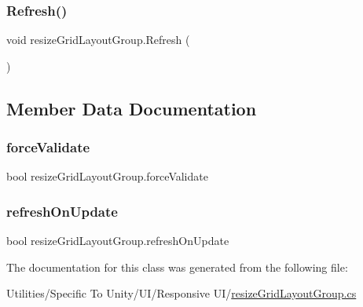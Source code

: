 \subsubsection{\texorpdfstring{Refresh()}{Refresh()}}
{\footnotesize\ttfamily void resize\+Grid\+Layout\+Group.\+Refresh (\begin{DoxyParamCaption}{ }\end{DoxyParamCaption})\hspace{0.3cm}{\ttfamily [inline]}}



\subsection{Member Data Documentation}
\mbox{\label{classresize_grid_layout_group_a138a851001032d6d388cae022f8c3e6f}} 
\subsubsection{\texorpdfstring{force\+Validate}{forceValidate}}
{\footnotesize\ttfamily bool resize\+Grid\+Layout\+Group.\+force\+Validate}

\mbox{\label{classresize_grid_layout_group_a578454d3481dd15bc62a7ec53702d98d}} 
\subsubsection{\texorpdfstring{refresh\+On\+Update}{refreshOnUpdate}}
{\footnotesize\ttfamily bool resize\+Grid\+Layout\+Group.\+refresh\+On\+Update}



The documentation for this class was generated from the following file\+:\begin{DoxyCompactItemize}
\item 
Utilities/\+Specific To Unity/\+U\+I/\+Responsive U\+I/\hyperlink{resize_grid_layout_group_8cs}{resize\+Grid\+Layout\+Group.\+cs}\end{DoxyCompactItemize}
